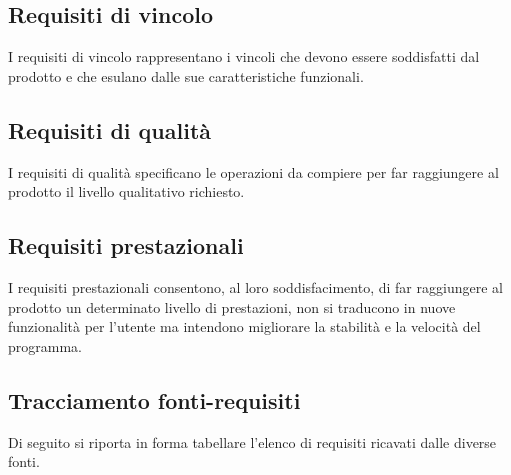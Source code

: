 \documentclass[a4paper]{article}
\begin{document}
	\subsection{Requisiti di vincolo}
	I requisiti di vincolo rappresentano i vincoli che devono essere soddisfatti dal prodotto e che esulano dalle
	sue caratteristiche funzionali.
	\subsection{Requisiti di qualità}
	I requisiti di qualità specificano le operazioni da compiere per far raggiungere al prodotto il livello 
	qualitativo richiesto.
	\subsection{Requisiti prestazionali}
	I requisiti prestazionali consentono, al loro soddisfacimento, di far raggiungere al prodotto un determinato
	livello di prestazioni, non si traducono in nuove funzionalità per l'utente ma intendono migliorare 
	la stabilità e la velocità del programma.
	
	\subsection{Tracciamento fonti-requisiti}
	Di seguito si riporta in forma tabellare l'elenco di requisiti ricavati dalle diverse fonti.
	
	\cleardoublepage
	\listoffigures
	
	\cleardoublepage
	\listoftables
		
\end{document}
